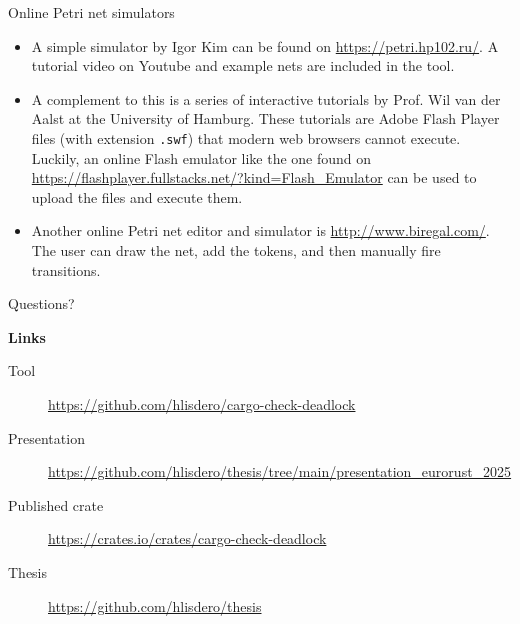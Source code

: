 \documentclass{beamer}
\begin{document}
\begin{frame}{Online Petri net simulators}
  \begin{itemize}
    \item A simple simulator by Igor Kim can be found on \url{https://petri.hp102.ru/}.
          A tutorial video on Youtube and example nets are included in the tool.
    \item A complement to this is a series of interactive tutorials by Prof. Wil van der Aalst
          at the University of Hamburg. These tutorials are Adobe Flash Player files (with extension \texttt{.swf})
          that modern web browsers cannot execute.
          Luckily, an online Flash emulator like the one found on \url{https://flashplayer.fullstacks.net/?kind=Flash_Emulator}
          can be used to upload the files and execute them.
    \item Another online Petri net editor and simulator is \url{http://www.biregal.com/}.
          The user can draw the net, add the tokens, and then manually fire transitions.
  \end{itemize}
\end{frame}

\begin{frame}{}
  \huge
  \centering
  Questions?
  

  \vfill
  \raggedright
  \normalsize
  \textbf{Links}

  \scriptsize

  \begin{description}
    \item [Tool] \url{https://github.com/hlisdero/cargo-check-deadlock}
    \item [Presentation] \url{https://github.com/hlisdero/thesis/tree/main/presentation_eurorust_2025}
    \item [Published crate] \url{https://crates.io/crates/cargo-check-deadlock}
    \item [Thesis] \url{https://github.com/hlisdero/thesis}
  \end{description}
\end{frame}
\end{document}
